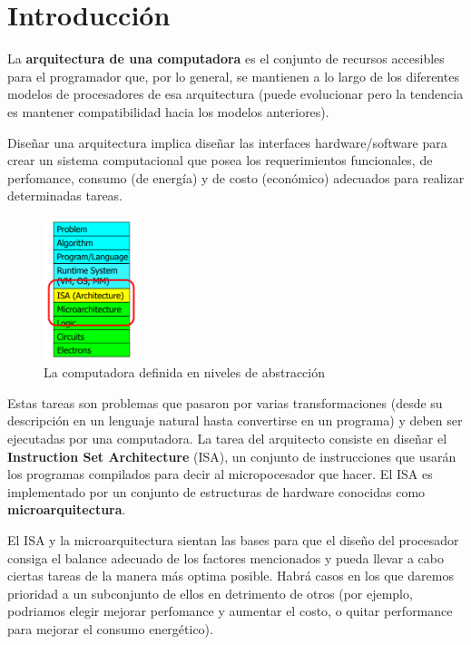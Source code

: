 \section{Introducción}

La \textbf{arquitectura de una computadora} es el conjunto de recursos accesibles para el programador que, por lo general, se mantienen a lo largo de los diferentes modelos de procesadores de esa arquitectura (puede evolucionar pero la tendencia es mantener compatibilidad hacia los modelos anteriores).

Diseñar una arquitectura implica diseñar las interfaces hardware/software para crear un sistema computacional que posea los requerimientos funcionales, de perfomance, consumo (de energía) y de costo (económico) adecuados para realizar determinadas tareas.

\begin{figure}
	\centering
	\includegraphics[width=0.25\textwidth]{imagenes/arquitectura}
	\caption{La computadora definida en niveles de abstracción}
	\label{fig:intro::arquitectura}
\end{figure}

Estas tareas son problemas que pasaron por varias transformaciones (desde su descripción en un lenguaje natural hasta convertirse en un programa) y deben ser ejecutadas por una computadora. La tarea del arquitecto consiste en diseñar el \textbf{Instruction Set Architecture} (ISA), un conjunto de instrucciones que usarán los programas compilados para decir al micropocesador que hacer. El ISA es implementado por un conjunto de estructuras de hardware conocidas como \textbf{microarquitectura}.

El ISA y la microarquitectura sientan las bases para que el diseño del procesador consiga el balance adecuado de los factores mencionados y pueda llevar a cabo ciertas tareas de la manera más optima posible. Habrá casos en los que daremos prioridad a un subconjunto de ellos en detrimento de otros (por ejemplo, podriamos elegir mejorar perfomance y aumentar el costo, o quitar performance para mejorar el consumo energético).

